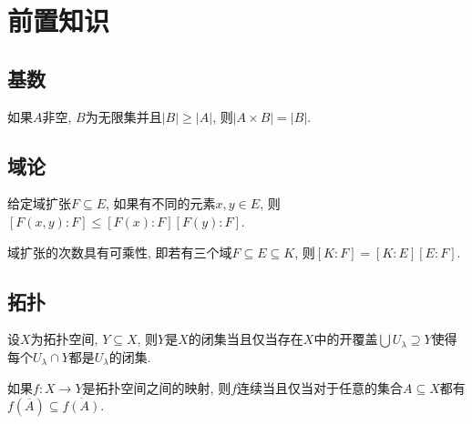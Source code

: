 
\section{前置知识}

\subsection{基数}

\begin{propositionnoproof}\label{prop:cardcartcor}
  如果$A$非空, $B$为无限集并且$\vert B\vert\geq \vert A\vert$, 则$\vert A\times B\vert=\vert B\vert$.
\end{propositionnoproof}

\subsection{域论}

\begin{propositionnoproof}\label{thm:fntfieldextdegree}
  给定域扩张$F\subseteq E$, 如果有不同的元素$x, y\in E$, 则$[F(x, y):F]\leq [F(x):F][F(y):F]$.
\end{propositionnoproof}

\begin{theoremnoproof}\label{thm:fieldextdegreemulti}
  域扩张的次数具有可乘性, 即若有三个域$F\subseteq E\subseteq K$, 则$[K:F]=[K:E][E:F]$.
\end{theoremnoproof}

\subsection{拓扑}

\begin{propositionnoproof}\label{prop:closedsetlocal}
  设$X$为拓扑空间, $Y\subseteq X$, 则$Y$是$X$的闭集当且仅当存在$X$中的开覆盖$\bigcup U_\lambda\supseteq Y$使得每个$U_\lambda\cap Y$都是$U_\lambda$的闭集.
\end{propositionnoproof}

\begin{propositionnoproof}\label{prop:continuousimageclosure}
  如果$f\colon X\to Y$是拓扑空间之间的映射, 则$f$连续当且仅当对于任意的集合$A\subseteq X$都有$f(\overline{A})\subseteq\overline{f(A)}$.
\end{propositionnoproof}

